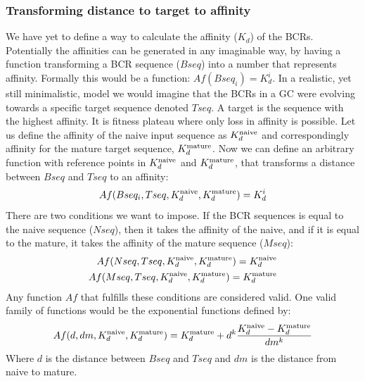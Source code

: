 \subsubsection{Transforming distance to target to affinity}
We have yet to define a way to calculate the affinity ($K_d$) of the BCRs.
Potentially the affinities can be generated in any imaginable way, by having a function transforming a BCR sequence ($Bseq$) into a number that represents affinity.
Formally this would be a function: $Af(Bseq_i) = K^i_d$.
In a realistic, yet still minimalistic, model we would imagine that the BCRs in a GC were evolving towards a specific target sequence denoted $Tseq$.
A target is the sequence with the highest affinity.
It is fitness plateau where only loss in affinity is possible.
Let us define the affinity of the naive input sequence as $K^{\text{naive}}_d$ and correspondingly affinity for the mature target sequence, $K^{\text{mature}}_d$.
Now we can define an arbitrary function with reference points in $K^{\text{naive}}_d$ and $K^{\text{mature}}_d$, that transforms a distance between $Bseq$ and $Tseq$ to an affinity:
$$
Af(Bseq_i, Tseq, K^{\text{naive}}_d, K^{\text{mature}}_d) = K^i_d
$$
There are two conditions we want to impose.
If the BCR sequences is equal to the naive sequence ($Nseq$), then it takes the affinity of the naive, and if it is equal to the mature, it takes the affinity of the mature sequence ($Mseq$):
\begin{equation}
\begin{split}
Af(Nseq, Tseq, K^{\text{naive}}_d, K^{\text{mature}}_d) = K^{\text{naive}}_d \\
Af(Mseq, Tseq, K^{\text{naive}}_d, K^{\text{mature}}_d) = K^{\text{mature}}_d
\end{split}
\label{eq:hd2affy_cond}
\end{equation}
Any function $Af$ that fulfills these conditions are considered valid.
One valid family of functions would be the exponential functions defined by:
\begin{equation}
Af(d, dm, K^{\text{naive}}_d, K^{\text{mature}}_d) = K^{\text{mature}}_d + d^k \frac{K^{\text{naive}}_d - K^{\text{mature}}_d}{dm^k}
\label{eq:hd2affy}
\end{equation}
Where $d$ is the distance between $Bseq$ and $Tseq$ and $dm$ is the distance from naive to mature.
